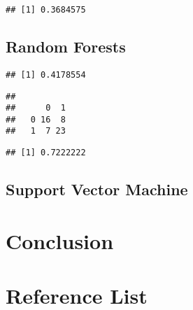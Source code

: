 \documentclass[11pt,preprint, authoryear]{elsarticle}
\numberwithin{equation}{section}
\numberwithin{figure}{section}
\numberwithin{table}{section}
\begin{document}
\begin{verbatim}
## [1] 0.3684575
\end{verbatim}

\hypertarget{random-forests}{%
\subsection{Random Forests}\label{random-forests}}

\begin{verbatim}
## [1] 0.4178554
\end{verbatim}

\begin{verbatim}
##    
##      0  1
##   0 16  8
##   1  7 23
\end{verbatim}

\begin{verbatim}
## [1] 0.7222222
\end{verbatim}

\hypertarget{support-vector-machine}{%
\subsection{Support Vector Machine}\label{support-vector-machine}}

\hypertarget{conclusion}{%
\section{Conclusion}\label{conclusion}}

\hypertarget{reference-list}{%
\section{Reference List}\label{reference-list}}


\end{document}
